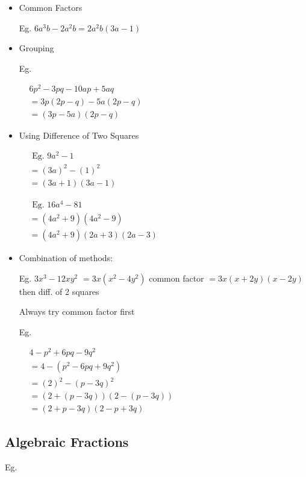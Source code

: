 \documentclass[twocolumn]{article}
\begin{document}
\begin{itemize} 
\item Common Factors

Eg. $6 a^3 b-2 a^2 b=2 a^2 b(3 a-1)$

\item Grouping

Eg.

$
\begin{aligned}
	& 6 p^2-3 p q-10 a p+5 a q \\
	& =3 p(2 p-q)-5 a(2 p-q) \\
	& =(3 p-5 a)(2 p-q)
\end{aligned}
$

\item Using Difference of Two Squares

$
\begin{aligned}
	& \text { Eg. } 9 a^2-1 \\
	& =(3a)^2 - (1)^2 \\
	& =(3 a+1)(3 a-1)
\end{aligned}
$

\noindent 
$
\begin{aligned}
	& \text { Eg. } 16 a^4-81 \\
	& =(4a^2+9)(4a^2-9) \\
	& =(4a^2+9)(2a+3)(2a-3)
\end{aligned}
$

\item Combination of methods:

Eg. $3 x^3-12 x y^2$
$=3 x\left(x^2-4 y^2\right)$ common factor
$=3 x(x+2 y)(x-2 y)$ then diff. of 2 squares

Always try common factor first

Eg.

$
\begin{aligned}
	& 4 - p^2 + 6pq - 9q^2  \\
	& =4 - (p^2 - 6pq + 9q^2) \\
	& =(2)^2 - (p-3q)^2 \\
	& =(2+(p-3q))(2-(p-3q)) \\
	& =(2+p-3q)(2-p+3q)
\end{aligned}
$

\end{itemize} 

\subsection*{Algebraic Fractions}

\noindent 
Eg.
\end{document}
